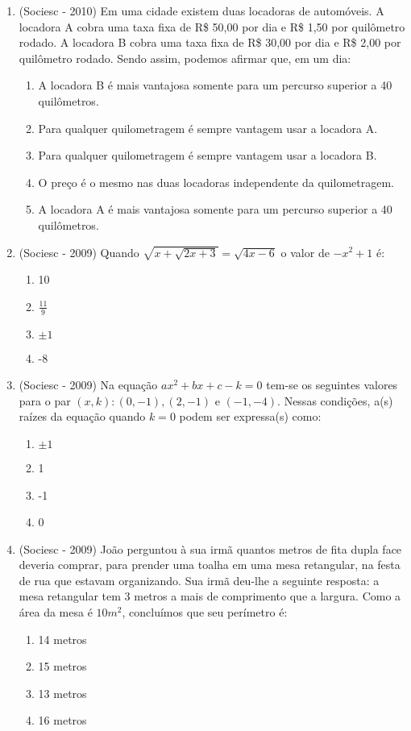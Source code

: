 \begin{enumerate}
 \item (Sociesc - 2010) Em uma cidade existem duas locadoras de automóveis. A locadora A cobra uma taxa fixa de R\$ 50,00 por dia e R\$ 1,50 por quilômetro rodado. A locadora B cobra uma taxa fixa de R\$ 30,00 por dia e R\$ 2,00 por quilômetro rodado. Sendo assim, podemos afirmar que, em um dia:
  \begin{enumerate}
  \item A locadora B é mais vantajosa somente para um percurso superior a 40 quilômetros.
  \item Para qualquer quilometragem é sempre vantagem usar a locadora A.
  \item Para qualquer quilometragem é sempre vantagem usar a locadora B.
  \item O preço é o mesmo nas duas locadoras independente da quilometragem.
  \item A locadora A é mais vantajosa somente para um percurso superior a 40 quilômetros. 
 \end{enumerate}

\item (Sociesc - 2009) Quando $\sqrt{x + \sqrt{2x+3}}= \sqrt{4x-6}$ o valor de $-x^2+1$ é:
 \begin{enumerate}
  \item 10
  \item $\frac{11}{9}$
  \item $\pm 1$
  \item -8
 \end{enumerate}
 
 \item (Sociesc - 2009) Na equação $ax^2+bx+c-k=0$ tem-se os seguintes valores para o par $(x, k): (0,-1), (2,-1) \text{ e } (-1,-4)$. Nessas condições, a(s) raízes da equação quando $k=0$ podem ser expressa(s) como:
 \begin{enumerate}
  \item $\pm 1$
  \item 1
  \item -1
  \item 0
 \end{enumerate}
 
 \item (Sociesc - 2009) João perguntou à sua irmã quantos metros de fita dupla face deveria comprar, para prender uma toalha em uma mesa retangular, na festa de rua que estavam organizando. Sua irmã deu-lhe a seguinte resposta: a mesa retangular tem 3 metros a mais de comprimento que a largura. Como a área da mesa é $10 m^2$, concluímos que seu perímetro é:
  \begin{enumerate}
  \item 14 metros
  \item 15 metros
  \item 13 metros
  \item 16 metros
 \end{enumerate}
 

\end{enumerate}
